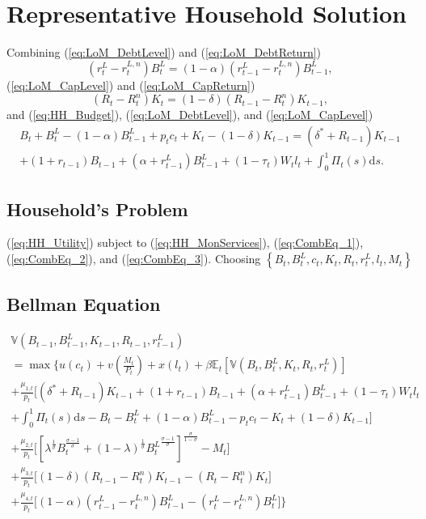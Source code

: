 \documentclass[11pt,a4paper,margin=1.5in]{article}
\begin{document}
\newpage
\appendix
{}
\section{Representative Household Solution}
\label{app:HH_Solution}

Combining (\ref{eq:LoM_DebtLevel}) and (\ref{eq:LoM_DebtReturn})
\begin{equation}
	\left(r^L_t-r^{L,n}_t\right)B^L_t = (1-\alpha)\left(r^L_{t-1}-r^{L,n}_t\right)B^L_{t-1},
	\label{eq:CombEq_1}
\end{equation}
(\ref{eq:LoM_CapLevel}) and (\ref{eq:LoM_CapReturn})
\begin{equation}
	\left(R_t-R^{n}_t\right)K_t = (1-\delta)\left(R_{t-1}-R^{n}_t\right)K_{t-1},
	\label{eq:CombEq_2}
\end{equation}
and (\ref{eq:HH_Budget}), (\ref{eq:LoM_DebtLevel}), and (\ref{eq:LoM_CapLevel})
\begin{multline}
	B_t + B^{L}_t - (1-\alpha)B^L_{t-1} + p_tc_t + K_t - (1-\delta)K_{t-1} = (\delta^* + R_{t-1})K_{t-1} \\+ (1+r_{t-1})B_{t-1} + (\alpha + r^L_{t-1})B^L_{t-1} + (1-\tau_t)W_tl_t + \int^1_0\Pi_t(s)\text{d}s.
	\label{eq:CombEq_3}
\end{multline}

\subsection{Household's Problem}
(\ref{eq:HH_Utility}) subject to (\ref{eq:HH_MonServices}), (\ref{eq:CombEq_1}), (\ref{eq:CombEq_2}), and (\ref{eq:CombEq_3}). Choosing 
$\left\{B_t, B^L_t, c_t, K_t, R_t, r^L_t, l_t, M_t\right\}$

\subsection{Bellman Equation}

\begin{multline}
	\mathbb{V}\!\left(B_{t-1}, B^L_{t-1}, K_{t-1}, R_{t-1}, r^L_{t-1}\right) \\= \max \Bigg\{u(c_t) + v\left(\frac{M_t}{P_t}\right) + x(l_t)  + \beta\mathbb{E}_t\!\left[\mathbb{V}\!\left(B_{t}, B^L_{t}, K_{t}, R_{t}, r^L_{t}\right)\right] \\
	+ \frac{\mu_{1,t}}{p_t} \Big[(\delta^* + R_{t-1})K_{t-1} + (1+r_{t-1})B_{t-1} + (\alpha + r^L_{t-1})B^L_{t-1} + (1-\tau_t)W_tl_t \\+ \int^1_0\Pi_t(s)\text{d}s -B_t - B^{L}_t + (1-\alpha)B^L_{t-1} - p_tc_t - K_t + (1-\delta)K_{t-1}\Big] \\
	+ \frac{\mu_{2,t}}{p_t}\Bigg[\left[\lambda^{\frac{1}{\sigma}}B_t^{\frac{\sigma-1}{\sigma}} + (1-\lambda)^{\frac{1}{\sigma}}{B^L_t}^{\frac{\sigma-1}{\sigma}}\right]^{\frac{\sigma}{1-\sigma}}-M_t\Bigg] \\
	+ \frac{\mu_{3,t}}{p_t}\Big[(1-\delta)\left(R_{t-1}-R^{n}_t\right)K_{t-1} - \left(R_t-R^{n}_t\right)K_t \Big] \\
	+ \frac{\mu_{4,t}}{p_t} \Big[(1-\alpha)\left(r^L_{t-1}-r^{L,n}_t\right)B^L_{t-1} - \left(r^L_t-r^{L,n}_t\right)B^L_t\Big]\Bigg\}
	\label{eq:Bellman}
\end{multline}
\end{document}
